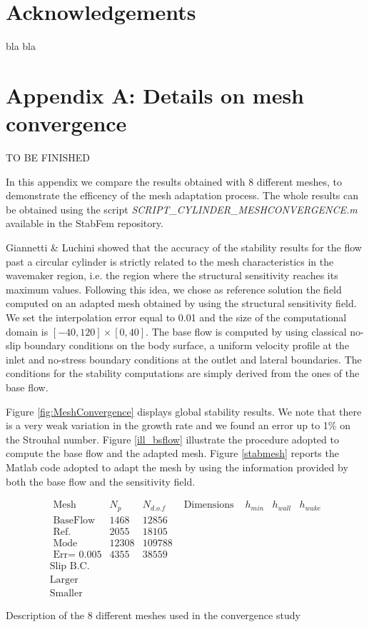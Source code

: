 \documentclass[twocolumn,10pt]{asme2ej}
\begin{document}
\section*{Acknowledgements}
bla bla

\section*{Appendix A: Details on mesh convergence}


TO BE FINISHED

In this appendix we compare the results obtained with 8 different meshes, to demonstrate the efficency of the mesh adaptation process. The whole results can be obtained using the script {\em SCRIPT\_CYLINDER\_MESHCONVERGENCE.m} available in the StabFem repository.

Giannetti \& Luchini\cite{GiannettiLuchini} showed that the accuracy of the stability 
results for the flow past a circular cylinder is strictly related to the mesh characteristics 
in the wavemaker region, i.e. the region where the structural sensitivity reaches its 
maximum values. Following this idea, we chose as reference solution the field
computed on an adapted mesh obtained by using the structural sensitivity field.
We set the interpolation error equal to 0.01 and the size of the computational domain 
is $[-40,120]\times[0,40]$. The base flow is computed by using classical no-slip 
boundary conditions on the body surface, a uniform velocity profile at the inlet
and no-stress boundary conditions at the outlet and lateral boundaries.
The conditions for the stability computations are simply derived from the ones of the base flow.

Figure \ref{fig:MeshConvergence} displays global stability results. We note that there is 
a very weak variation in the growth rate and we found an error up to 1\% on the 
Strouhal number. Figure \ref{ill_bsflow} illustrate the procedure adopted to compute the 
base flow and the adapted mesh. Figure \ref{stabmesh} reports the Matlab code 
adopted to adapt the mesh by using the information provided by both the base flow and the sensitivity field. 


\begin{table}
$$
\begin{array}{c|c|c|c|c|c|c|}
\mbox{ Mesh } & N_p & N_{d.o.f} & \mbox{ Dimensions } & h_{min} & h_{wall} & h_{wake} \\ 
\mbox{ BaseFlow } & 1468 & 12856 \\
\mbox{ Ref.} & 2055 & 18105\\
\mbox{ Mode} &12308 & 109788 \\
\mbox{ Err= }0.005 & 4355 & 38559 \\
\mbox{Slip B.C.} & \\ 
\mbox{Larger} & \\
\mbox{Smaller} &  
\end{array}
$$
\caption{Description of the 8 different meshes used in the convergence study}
\end{table}
\end{document}
